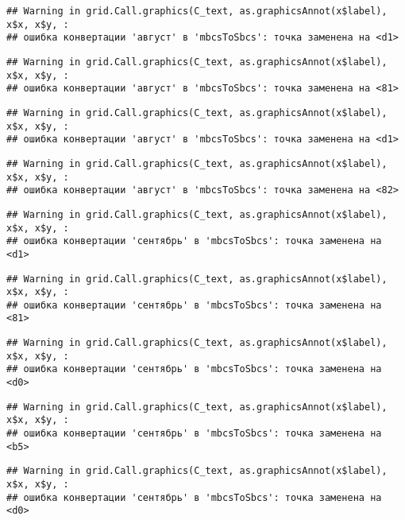\documentclass[
]{article}
\begin{document}
\begin{verbatim}
## Warning in grid.Call.graphics(C_text, as.graphicsAnnot(x$label), x$x, x$y, :
## ошибка конвертации 'август' в 'mbcsToSbcs': точка заменена на <d1>
\end{verbatim}

\begin{verbatim}
## Warning in grid.Call.graphics(C_text, as.graphicsAnnot(x$label), x$x, x$y, :
## ошибка конвертации 'август' в 'mbcsToSbcs': точка заменена на <81>
\end{verbatim}

\begin{verbatim}
## Warning in grid.Call.graphics(C_text, as.graphicsAnnot(x$label), x$x, x$y, :
## ошибка конвертации 'август' в 'mbcsToSbcs': точка заменена на <d1>
\end{verbatim}

\begin{verbatim}
## Warning in grid.Call.graphics(C_text, as.graphicsAnnot(x$label), x$x, x$y, :
## ошибка конвертации 'август' в 'mbcsToSbcs': точка заменена на <82>
\end{verbatim}

\begin{verbatim}
## Warning in grid.Call.graphics(C_text, as.graphicsAnnot(x$label), x$x, x$y, :
## ошибка конвертации 'сентябрь' в 'mbcsToSbcs': точка заменена на <d1>
\end{verbatim}

\begin{verbatim}
## Warning in grid.Call.graphics(C_text, as.graphicsAnnot(x$label), x$x, x$y, :
## ошибка конвертации 'сентябрь' в 'mbcsToSbcs': точка заменена на <81>
\end{verbatim}

\begin{verbatim}
## Warning in grid.Call.graphics(C_text, as.graphicsAnnot(x$label), x$x, x$y, :
## ошибка конвертации 'сентябрь' в 'mbcsToSbcs': точка заменена на <d0>
\end{verbatim}

\begin{verbatim}
## Warning in grid.Call.graphics(C_text, as.graphicsAnnot(x$label), x$x, x$y, :
## ошибка конвертации 'сентябрь' в 'mbcsToSbcs': точка заменена на <b5>
\end{verbatim}

\begin{verbatim}
## Warning in grid.Call.graphics(C_text, as.graphicsAnnot(x$label), x$x, x$y, :
## ошибка конвертации 'сентябрь' в 'mbcsToSbcs': точка заменена на <d0>
\end{verbatim}
\end{document}
